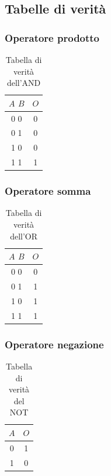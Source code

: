 \documentclass[a4paper]{article}
\theoremstyle{break}
\theoremstyle{break}
\theoremstyle{break}
\theoremstyle{break}
\begin{document}
\subsection{Tabelle di verità}
\subsubsection{Operatore prodotto}
\begin{table}[H]
    \begin{center}
        \begin{tabular}{c|c}
            \( A \)  \( B \) & \( O \) \\
            \hline
            0        0       & 0       \\
            0        1       & 0       \\
            1        0       & 0       \\
            1        1       & 1       \\
        \end{tabular}
    \end{center}
    \caption{Tabella di verità dell'AND}
\end{table}

\subsubsection{Operatore somma}
\begin{table}[H]
    \begin{center}
        \begin{tabular}{c|c}
            \( A \)  \( B \) & \( O \) \\
            \hline
            0        0       & 0       \\
            0        1       & 1       \\
            1        0       & 1       \\
            1        1       & 1       \\
        \end{tabular}
    \end{center}
    \caption{Tabella di verità dell'OR}
\end{table}

\subsubsection{Operatore negazione}
\begin{table}[H]
    \begin{center}
        \begin{tabular}{c|c}
            \( A \) & \( O \) \\
            \hline
            0       & 1       \\
            1       & 0       \\
        \end{tabular}
    \end{center}
    \caption{Tabella di verità del NOT}
\end{table}
\end{document}

